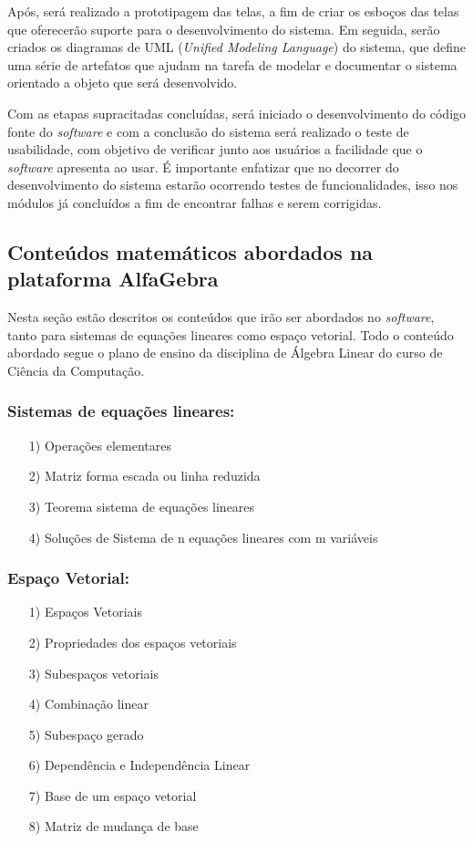 Após, será realizado a prototipagem das telas, a fim de criar os esboços das telas que oferecerão suporte para o desenvolvimento do sistema. Em seguida, serão criados os diagramas de UML (\textit{Unified Modeling Language}) do sistema, que define uma série de artefatos que ajudam na tarefa de modelar e documentar o sistema orientado a objeto que será desenvolvido.

Com as etapas supracitadas concluídas, será iniciado o desenvolvimento do código fonte do \textit{software} e com a conclusão do sistema será realizado o teste de usabilidade, com objetivo de verificar junto aos usuários a facilidade que o \textit{software} apresenta ao usar. É importante enfatizar que no decorrer do desenvolvimento do sistema estarão ocorrendo testes de funcionalidades, isso nos módulos já concluídos a fim de encontrar falhas e serem corrigidas.

\subsection{Conteúdos matemáticos abordados na plataforma AlfaGebra}
\noindent Nesta seção estão descritos os conteúdos que irão ser abordados no \textit{software}, tanto para sistemas de equações lineares como espaço vetorial. Todo o conteúdo abordado segue o plano de ensino da disciplina de Álgebra Linear do curso de Ciência da Computação.  

\subsubsection{Sistemas de equações lineares:}
\begin{itemize}
    \item[1)] Operações elementares
    \item[2)] Matriz forma escada ou linha reduzida
    \item[3)] Teorema sistema de equações lineares
    \item[4)] Soluções de Sistema de n equações lineares com m variáveis
\end{itemize}

\subsubsection{Espaço Vetorial:} 
\begin{itemize}
    \item[1)] Espaços Vetoriais
    \item[2)] Propriedades dos espaços vetoriais
    \item[3)] Subespaços vetoriais
    \item[4)] Combinação linear
    \item[5)] Subespaço gerado
    \item[6)] Dependência e Independência Linear
    \item[7)] Base de um espaço vetorial
    \item[8)] Matriz de mudança de base
\end{itemize}

